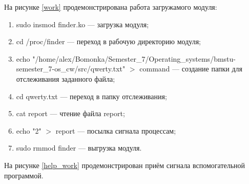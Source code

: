 На рисунке \ref{work} продемонстрирована работа загружамого модуля:
\begin{enumerate}[label=\arabic*.]
	\item sudo insmod finder.ko --- загрузка модуля;
	\item cd /proc/finder --- переход в рабочую директорию модуля;
	\item echo "/home/alex/Bomonka/Semester\_7/Operating\_systems/bmstu-semester\_7-os\_cw/src/qwerty.txt" $>$ command --- создание папки для отслеживания заданного файла;
	\item cd qwerty.txt --- переход в папку отслеживания;
	\item cat report --- чтение файла report;
	\item echo "2" $>$ report --- посылка сигнала процессам;
	\item sudo rmmod finder --- выгрузка модуля.
\end{enumerate}


\pagebreak

На рисунке \ref{help_work} продемонстрирован приём сигнала вспомогательной программой.

